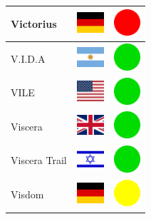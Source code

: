 \documentclass[12pt, a4paper, twoside]{report}
\begin{document}
\begin{center}
\begin{longtable}{|p{5cm}|p{2cm}|p{2cm}|}
 Victorius                                                  & \includegraphics[width=1cm]{../4x3/de} &   \includegraphics[width=1cm]{../likes/n} \\ \hline
 V.I.D.A                                                    & \includegraphics[width=1cm]{../4x3/ar} &   \includegraphics[width=1cm]{../likes/y} \\ \hline
 VILE                                                       & \includegraphics[width=1cm]{../4x3/us} &   \includegraphics[width=1cm]{../likes/y} \\ \hline
 Viscera                                                    & \includegraphics[width=1cm]{../4x3/gb} &   \includegraphics[width=1cm]{../likes/y} \\ \hline
 Viscera Trail                                              & \includegraphics[width=1cm]{../4x3/il} &   \includegraphics[width=1cm]{../likes/y} \\ \hline
 Visdom                                                     & \includegraphics[width=1cm]{../4x3/de} &   \includegraphics[width=1cm]{../likes/m} \\ \hline

\end{longtable}
\end{center}
\end{document}
